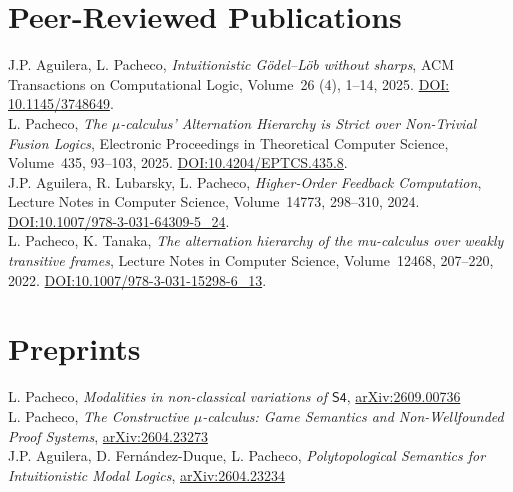 \documentclass[11pt, a4paper]{article}
\newcommand{\highlightme}[1]{{#1}}
\begin{document}
\newpage


\section*{Peer-Reviewed Publications}

\noindent
J.P. Aguilera, \highlightme{L. Pacheco}, \emph{Intuitionistic Gödel--Löb without sharps}, ACM Transactions on Computational Logic, Volume~26 (4), 1--14, 2025. \href{https://doi.org/10.1145/3748649}{DOI: 10.1145/3748649}. \\

\highlightme{L. Pacheco}, \emph{The $\mu$-calculus' Alternation Hierarchy is Strict over Non-Trivial Fusion Logics}, Electronic Proceedings in Theoretical Computer Science, Volume~435, 93--103, 2025. \href{https://doi.org/10.4204/EPTCS.435.8}{DOI:10.4204/EPTCS.435.8}. \\

J.P. Aguilera, R. Lubarsky, \highlightme{L. Pacheco}, \emph{Higher-Order Feedback Computation}, Lecture Notes in Computer Science, Volume~14773, 298--310, 2024. \href{https://doi.org/10.1007/978-3-031-64309-5_24}{DOI:10.1007/978-3-031-64309-5\_24}. \\

\highlightme{L. Pacheco}, K. Tanaka, \emph{The alternation hierarchy of the mu-calculus over weakly transitive frames}, Lecture Notes in Computer Science, Volume~12468, 207--220, 2022. \href{https://doi.org/10.1007/978-3-031-15298-6_13}{DOI:10.1007/978-3-031-15298-6\_13}. \\


\section*{Preprints}

\noindent

\highlightme{L. Pacheco}, \emph{Modalities in non-classical variations of $\mathsf{S4}$}, \href{https://arxiv.org/abs/2609.00736}{arXiv:2609.00736} \\

\highlightme{L. Pacheco}, \emph{The Constructive $\mu$-calculus: Game Semantics and Non-Wellfounded Proof Systems}, \href{https://arxiv.org/abs/2604.23273}{arXiv:2604.23273} \\

J.P. Aguilera, D. Fernández-Duque, \highlightme{L. Pacheco}, \emph{Polytopological Semantics for Intuitionistic Modal Logics}, \href{https://arxiv.org/abs/2604.23234}{arXiv:2604.23234} \\
\end{document}

